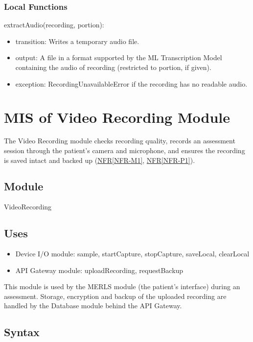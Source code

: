 \documentclass[12pt, titlepage]{article}
\newcommand{\srsref}[2]{\href{https://github.com/Nour-Fawaz/MacaBoca/blob/main/pdfs/SRS/SRS.pdf}{#1\ref*{#2}}}
\begin{document}
\subsubsection{Local Functions}

\noindent extractAudio(recording, portion):
\begin{itemize}
\item transition: Writes a temporary audio file.
\item output: A file in a format supported by the ML Transcription Model containing the audio of recording (restricted to portion, if given).
\item exception: RecordingUnavailableError if the recording has no readable audio.
\end{itemize}

\newpage
\section{MIS of Video Recording Module} \label{VideoRecording}
The Video Recording module checks recording quality, records an assessment session through the patient's camera and microphone, and ensures the recording is saved intact and backed up (\srsref{NFR}{NFR-M1}, \srsref{NFR}{NFR-P1}).

\subsection{Module}
VideoRecording

\subsection{Uses}
\begin{itemize}
\item Device I/O module: sample, startCapture, stopCapture, saveLocal, clearLocal
\item API Gateway module: uploadRecording, requestBackup
\end{itemize}
This module is used by the MERLS module (the patient's interface) during an assessment. Storage, encryption and backup of the uploaded recording are handled by the Database module behind the API Gateway.

\subsection{Syntax}
\end{document}
